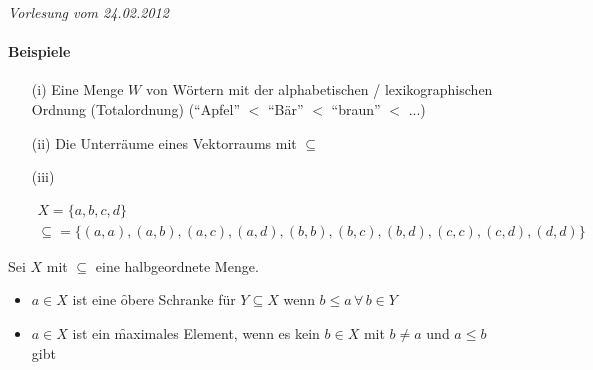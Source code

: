 \newpage
\noindent \textit{Vorlesung vom 24.02.2012}
\paragraph{Beispiele}
\begin{itemize}
 \item[(i)] Eine Menge $W$ von Wörtern mit der alphabetischen / lexikographischen Ordnung (Totalordnung) (``Apfel'' $<$ ``Bär'' $<$ ``braun'' $<$ ...)
 \item[(ii)] Die Unterräume eines Vektorraums mit $\subseteq$
 \item[(iii)]
   \begin{center}
   \end{center}
\begin{align}
X = \{a, b, c, d\}\\
\subseteq = \{(a, a), (a, b), (a, c), (a, d), (b, b), (b, c), (b, d), (c, c), (c, d), (d, d)\}
\end{align}
\end{itemize}

Sei $X$ mit $\subseteq$ eine halbgeordnete Menge.
\begin{itemize}
 \item $a \in X$ ist eine \f{obere Schranke} für $Y \subseteq X$ wenn $b \leq a\, \forall\, b \in Y$
 \item $a \in X$ ist ein \f{maximales Element}, wenn es kein $b \in X$ mit $b \neq a$ und $a \leq b$ gibt
\end{itemize}

